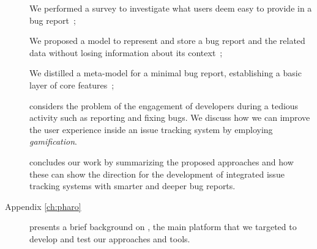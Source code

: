\begin{description}
  We performed a survey to investigate what users deem easy to provide in a bug report~\cite{DalS2016a};

  We proposed a model to represent and store a bug report and the related data without losing information about its context~\cite{DalS2016a};

  We distilled a meta-model for a minimal bug report, establishing a basic layer of core features~\cite{DalS2016a};


  \item[\chref{ch:gamification}] considers the problem of the engagement of developers during a tedious activity such as reporting and fixing bugs. We discuss how we can improve the user experience inside an issue tracking system by employing \emph{gamification}.

  \item[\chref{ch:conclusion}] concludes our work by summarizing the proposed approaches and how these can show the direction for the development of integrated issue tracking systems with smarter and deeper bug reports.

  \item[Appendix \ref{ch:pharo}] presents a brief background on \pha, the main platform that we targeted to develop and test our approaches and tools.

\end{description}
